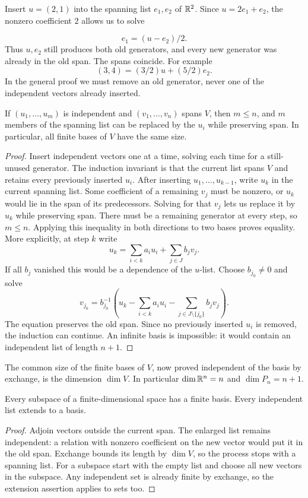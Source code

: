 \begin{example}
Insert $u=(2,1)$ into the spanning list $e_1,e_2$ of $\mathbb{R}^2$.
Since $u=2e_1+e_2$, the nonzero coefficient $2$ allows us to solve

\[
e_1=(u-e_2)/2.
\]
 Thus $u,e_2$ still produces both old generators,
and every new generator was already in the old span. The spans coincide.
For example
\[
(3,4)=(3/2)u+(5/2)e_2.
\]
 In the general proof we must
remove an old generator, never one of the independent vectors already inserted.
\end{example}
\begin{theorem}
\label{thm:exchange}
If $(u_1,\ldots,u_m)$ is independent and $(v_1,\ldots,v_n)$ spans $V$,
then $m\leq n$, and $m$ members of the spanning list can be replaced
by the $u_i$ while preserving span. In particular, all finite bases of
$V$ have the same size.
\end{theorem}
\begin{proof}
Insert independent vectors one at a time, solving each time
for a still-unused generator. The induction invariant is that the current
list spans $V$ and retains every previously inserted $u_i$.
After inserting $u_1,\ldots,u_{k-1}$,
write $u_k$ in the current spanning list. Some coefficient of a remaining
$v_j$ must be nonzero, or $u_k$ would lie in the span of its predecessors.
Solving for that $v_j$ lets us replace it by $u_k$ while preserving span.
There must be a remaining generator at every step, so $m\leq n$.
Applying this inequality in both directions to two bases proves equality.
More explicitly, at step $k$ write
\[
u_k=\sum_{i<k}a_i u_i+\sum_{j\in J}b_jv_j.
\]
If all $b_j$ vanished this would be a dependence of the $u$-list.
Choose $b_{j_0}\ne0$ and solve
\[
v_{j_0}=b_{j_0}^{-1}
\left(u_k-\sum_{i<k}a_i u_i-\sum_{j\in J\setminus\{j_0\}}b_jv_j\right).
\]
The equation preserves the old span. Since no previously inserted $u_i$
is removed, the induction can continue.
An infinite basis is impossible: it would contain an independent list of
length $n+1$.
\end{proof}

\begin{definition}[Dimension]
The common size of the finite bases of $V$, now proved independent of the
basis by exchange, is the dimension $\dim V$. In particular $\dim\mathbb{R}^n=n$
and $\dim P_n=n+1$.
\end{definition}

\begin{lemma}
\label{lem:subspace-basis}
Every subspace of a finite-dimensional space has a finite basis. Every
independent list extends to a basis.
\end{lemma}
\begin{proof}
Adjoin vectors outside the current span. The enlarged list remains
independent: a relation with nonzero coefficient on the new vector would
put it in the old span. Exchange bounds its length by $\dim V$, so the
process stops with a spanning list. For a subspace start with the empty
list and choose all new vectors in the subspace. Any independent set is
already finite by exchange, so the extension assertion applies to sets too.
\end{proof}

